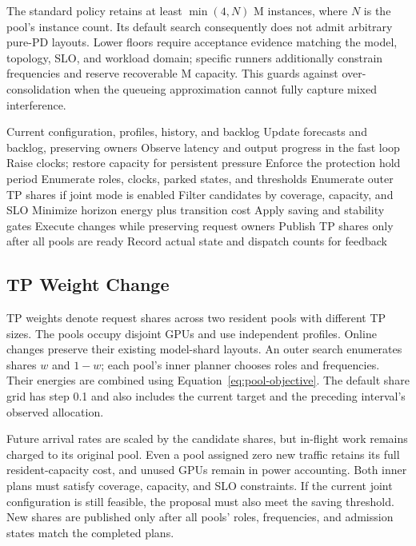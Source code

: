 \documentclass[11pt,a4paper,twocolumn]{article}
\begin{document}
The standard policy retains at least $\min(4,N)$ M
instances, where $N$ is the pool's instance count.
Its default search consequently does not admit arbitrary
pure-PD layouts. Lower floors require acceptance evidence
matching the model, topology, SLO, and workload domain;
specific runners additionally constrain frequencies and
reserve recoverable M capacity. This guards against
over-consolidation when the queueing approximation cannot
fully capture mixed interference.

\begin{algorithm}[t]
\caption{Adaptive pool control}
\label{alg:adapt}
\small
\begin{algorithmic}[1]
\Require Current configuration, profiles, history, and backlog
\State Update forecasts and backlog, preserving owners
\State Observe latency and output progress in the fast loop
  \State Raise clocks; restore capacity for persistent pressure
  \State Enforce the protection hold period
\EndIf
{}
  \State Enumerate roles, clocks, parked states, and thresholds
  \State Enumerate outer TP shares if joint mode is enabled
  \State Filter candidates by coverage, capacity, and SLO
  \State Minimize horizon energy plus transition cost
  \State Apply saving and stability gates
  \State Execute changes while preserving request owners
  \State Publish TP shares only after all pools are ready
\EndIf
\State Record actual state and dispatch counts for feedback
\end{algorithmic}
\end{algorithm}

\subsection{TP Weight Change}

TP weights denote request shares across two resident pools
with different TP sizes. The pools occupy disjoint GPUs
and use independent profiles. Online changes preserve
their existing model-shard layouts. An outer search
enumerates shares $w$ and $1-w$; each pool's inner planner
chooses roles and frequencies. Their energies are combined
using Equation~\eqref{eq:pool-objective}. The default share
grid has step 0.1 and also includes the current target
and the preceding interval's observed allocation.

Future arrival rates are scaled by the candidate shares,
but in-flight work remains charged to its original pool.
Even a pool assigned zero new traffic retains its full
resident-capacity cost, and unused GPUs remain in power
accounting. Both inner plans must satisfy coverage,
capacity, and SLO constraints. If the current joint
configuration is still feasible, the proposal must also
meet the saving threshold. New shares are published only
after all pools' roles, frequencies, and admission states
match the completed plans.
\end{document}
